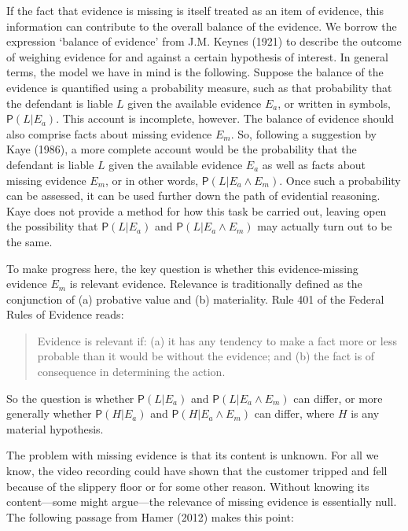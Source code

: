 \documentclass[
  10pt,
  dvipsnames,enabledeprecatedfontcommands]{scrartcl}
\newcommand{\pr}[1]{\mathsf{P}(#1)}
\begin{document}
If the fact that evidence is missing is itself treated as an item of
evidence, this information can contribute to the overall balance of the
evidence. We borrow the expression `balance of evidence' from J.M.
Keynes (1921) to describe the outcome of weighing evidence for and
against a certain hypothesis of interest. In general terms, the model we
have in mind is the following. Suppose the balance of the evidence is
quantified using a probability measure, such as that probability that
the defendant is liable \(L\) given the available evidence \(E_a\), or
written in symbols, \(\pr{L \vert E_a}\). This account is incomplete,
however. The balance of evidence should also comprise facts about
missing evidence \(E_m\). So, following a suggestion by Kaye (1986), a
more complete account would be the probability that the defendant is
liable \(L\) given the available evidence \(E_a\) as well as facts about
missing evidence \(E_m\), or in other words,
\(\pr{L \vert E_a \wedge E_m}\). Once such a probability can be
assessed, it can be used further down the path of evidential reasoning.
Kaye does not provide a method for how this task be carried out, leaving
open the possibility that \(\pr{L \vert E_a}\) and
\(\pr{L \vert E_a \wedge E_m}\) may actually turn out to be the same.

To make progress here, the key question is whether this evidence-missing
evidence \(E_m\) is relevant evidence. Relevance is traditionally
defined as the conjunction of (a) probative value and (b) materiality.
Rule 401 of the Federal Rules of Evidence reads:

\begin{quote}
Evidence is relevant if: (a) it has any tendency to make a fact more or less probable than it would be without the evidence; and (b) the fact is of consequence in determining the action.
\end{quote}

\noindent So the question is whether \(\pr{L \vert E_a}\) and
\(\pr{L \vert E_a \wedge E_m}\) can differ, or more generally whether
\(\pr{H \vert E_a}\) and \(\pr{H \vert E_a \wedge E_m}\) can differ,
where \(H\) is any material hypothesis.

The problem with missing evidence is that its content is unknown. For
all we know, the video recording could have shown that the customer
tripped and fell because of the slippery floor or for some other reason.
Without knowing its content---some might argue---the relevance of
missing evidence is essentially null. The following passage from Hamer
(2012) makes this point:
\end{document}
